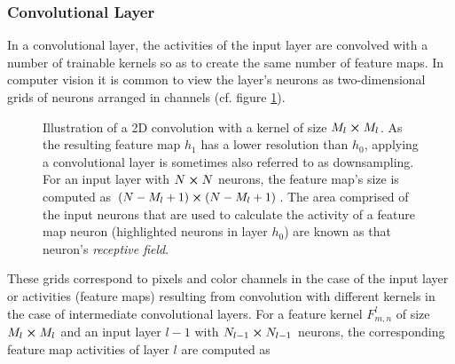 \subsubsection{Convolutional Layer}
In a convolutional layer, the activities of the input layer are convolved with a number of trainable kernels so as to create the same number of feature maps. In computer vision it is common to view the layer's neurons as two-dimensional grids of neurons arranged in channels (cf. figure \ref{fig:2dconvolution}).
\begin{figure}[H]
    \centering
{}
\caption[Illustration of receptive field in 2D convolutional layer]{Illustration of a 2D convolution with a kernel of size $M_l\cp M_l$. As the resulting feature map $h_1$ has a lower resolution than $h_0$, applying a convolutional layer is sometimes also referred to as downsampling. For an input layer with $N\cp N$ neurons, the feature map's size is computed as $(N-M_l+1)\cp (N-M_l+1)$. The area comprised of the input neurons that are used to calculate the activity of a feature map neuron (highlighted neurons in layer $h_0$) are known as that neuron's \emph{receptive field}.}\label{fig:2dconvolution}
\end{figure}\noindent
These grids correspond to pixels and color channels in the case of the input layer or activities (feature maps) resulting from convolution with different kernels in the case of intermediate convolutional layers. For a feature kernel $F_{m,n}^l$ of size $M_l\cp M_l$ and an input layer $l-1$ with $N_{l-1}\cp N_{l-1}$ neurons, the corresponding feature map activities of layer $l$ are computed as
